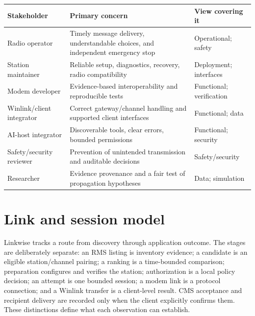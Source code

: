 \documentclass[11pt,a4paper]{article}
\begin{document}
\clearpage
\begin{landscape}
\thispagestyle{plain}
\label{tab:stakeholders}
\begin{tabularx}{\linewidth}{@{}p{1.8in}X p{2.0in}@{}}
\toprule
\textbf{Stakeholder} & \textbf{Primary concern} & \textbf{View covering it}\\
\midrule
Radio operator & Timely message delivery, understandable choices, and independent emergency stop & Operational; safety \\
Station maintainer & Reliable setup, diagnostics, recovery, radio compatibility & Deployment; interfaces \\
Modem developer & Evidence-based interoperability and reproducible tests & Functional; verification \\
Winlink/client integrator & Correct gateway/channel handling and supported client interfaces & Functional; data \\
AI-host integrator & Discoverable tools, clear errors, bounded permissions & Functional; security \\
Safety/security reviewer & Prevention of unintended transmission and auditable decisions & Safety/security \\
Researcher & Evidence provenance and a fair test of propagation hypotheses & Data; simulation \\
\bottomrule
\end{tabularx}
\end{landscape}
\clearpage

\section{Link and session model}
Linkwise tracks a route from discovery through application outcome. The stages
are deliberately separate: an RMS listing is inventory evidence; a candidate
is an eligible station/channel pairing; a ranking is a time-bounded comparison;
preparation configures and verifies the station; authorization is a local
policy decision; an attempt is one bounded session; a modem link is a protocol
connection; and a Winlink transfer is a client-level result. CMS acceptance
and recipient delivery are recorded only when the client explicitly confirms
them. These distinctions define what each observation can establish.
\end{document}

